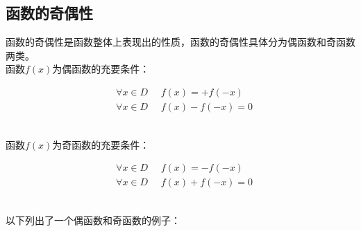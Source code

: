 \documentclass[UTF8]{ctexart}
\begin{document}
\subsection{函数的奇偶性}
    函数的奇偶性是函数整体上表现出的性质，函数的奇偶性具体分为偶函数和奇函数两类。\\[3mm]
    函数$f(x)$为偶函数的充要条件：
    \begin{large}
        \begin{align*}
            &\forall x\in D~~~~~~f(x)=+f(-x)\\[3mm]
            &\forall x\in D~~~~~~f(x)-f(-x)=0
        \end{align*}
    \end{large}\\
    函数$f(x)$为奇函数的充要条件：
    \begin{large}
        \begin{align*}
            &\forall x\in D~~~~~~f(x)=-f(-x)\\[3mm]
            &\forall x\in D~~~~~~f(x)+f(-x)=0
        \end{align*}
    \end{large}\\
    以下列出了一个偶函数和奇函数的例子：
\end{document}
